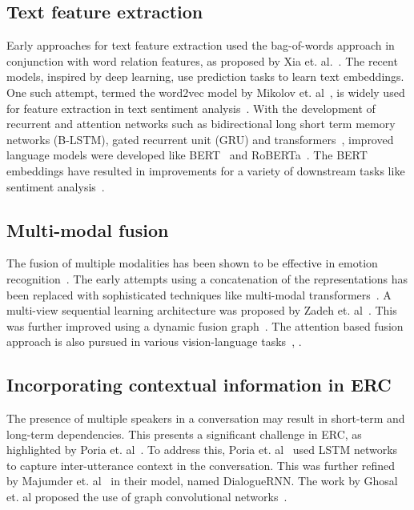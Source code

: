 \documentclass[lettersize,journal]{IEEEtran}
\begin{document}
\subsection{Text feature extraction}
Early approaches for text feature extraction used the bag-of-words approach  in conjunction with word relation features, as proposed by Xia et. al.~\cite{xia2010exploring}. The recent models, inspired by deep learning, use prediction tasks to learn text embeddings. One such attempt, termed the word2vec model by Mikolov et. al~\cite{mikolov2018advances}, is widely used for feature extraction in text sentiment analysis~\cite{majumder2018multimodal, sharma2017vector, liu2017sentiment}. With the development of recurrent and attention networks such as bidirectional long short term memory networks (B-LSTM), gated recurrent unit (GRU) and transformers~\cite{vaswani2017attention}, improved language models were developed like BERT~\cite{devlin2019bert} and RoBERTa~\cite{liu2019roberta}. The BERT embeddings have resulted in improvements for a variety of downstream tasks like sentiment analysis~\cite{lian2022smin}.

\subsection{Multi-modal fusion}
The fusion of multiple modalities has been shown to be effective in emotion recognition~\cite{poria2017context}. The early attempts using  a concatenation of the representations has been replaced with sophisticated techniques like multi-modal transformers~\cite{tsai2019multimodal, dutta2022multimodal}. A multi-view   sequential learning architecture was proposed by Zadeh et. al~\cite{zadeh2018memory}. This was further improved using a dynamic fusion graph~\cite{zadeh2018multimodal}. The attention based fusion approach is also pursued in various vision-language tasks~\cite{lu2019vilbert}, \cite{tan2019lxmert}.
\subsection{Incorporating contextual information in ERC}
The presence of multiple speakers in a conversation may result in short-term and long-term dependencies. This presents a significant challenge in ERC, as highlighted by Poria et. al~\cite{poria2019emotion}. To address this, Poria et. al~\cite{poria2017context} used LSTM networks to capture inter-utterance context in the conversation. This was further refined by Majumder et. al~\cite{majumder2019dialoguernn} in their model, named DialogueRNN. The work by Ghosal et. al proposed the use of graph convolutional networks~\cite{ghosal2019dialoguegcn}. 
\end{document}
